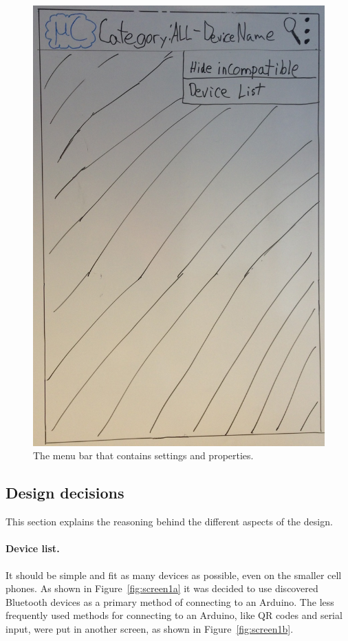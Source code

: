 \begin{figure}[H]
\centering
\includegraphics[scale=0.2]{images/Design_guide/ScreenXa.png}
\caption[Screen Xa - Action overflow]{The menu bar that contains settings and properties.}
\label{fig:screenXa}
\end{figure}

	\subsection{Design decisions}
	This section explains the reasoning behind the different aspects of the design.

	\paragraph{Device list.}
	It should be simple and fit as many devices as possible, even on the smaller cell phones. As shown in Figure~\ref{fig:screen1a} it was decided to use discovered Bluetooth devices as a primary method of connecting to an Arduino. The less frequently used methods for connecting to an Arduino, like QR codes and serial input, were put in another screen, as shown in Figure~\ref{fig:screen1b}. \\

